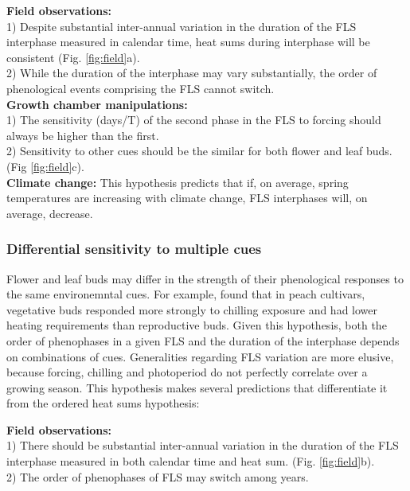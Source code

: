 \documentclass[11pt]{article}
\begin{document}
\noindent \textbf{Field observations:}\\ 1) Despite substantial inter-annual variation in the duration of the FLS interphase measured in calendar time, heat sums during interphase will be consistent (Fig. \ref{fig:field}a).\\ 2) While the duration of the interphase may vary substantially, the order of phenological events comprising the FLS cannot switch. \\

\noindent \textbf{Growth chamber manipulations:}
\\1) The sensitivity (\delta days/\delta T) of the second phase in the FLS to forcing should always be higher than the first.\\ 2) Sensitivity to other cues should be the similar for both flower and leaf buds. (Fig \ref{fig:field}c).\\

\noindent \textbf{Climate change:} This hypothesis predicts that if, on average, spring temperatures are increasing with climate change, FLS interphases will, on average, decrease.\\

\subsubsection*{Differential sensitivity to multiple cues}
 \noindent Flower and leaf buds may differ in the strength of their phenological responses to the same environemntal cues. For example, \citet{Garigalio2016} found that in peach cultivars, vegetative buds responded more strongly to chilling exposure and had lower heating requirements than reproductive buds. Given this hypothesis, both the order of phenophases in a given FLS and the duration of the interphase depends on combinations of cues. Generalities regarding FLS variation are more elusive, because forcing, chilling and photoperiod do not perfectly correlate over a growing season. This hypothesis makes several predictions that differentiate it from the ordered heat sums hypothesis:

\noindent \textbf{Field observations:}\\ 1)  There should be substantial inter-annual variation in the duration of the FLS interphase measured in both calendar time and heat sum. (Fig. \ref{fig:field}b).\\ 2) The order of phenophases of FLS may switch among years.\\
\end{document}
